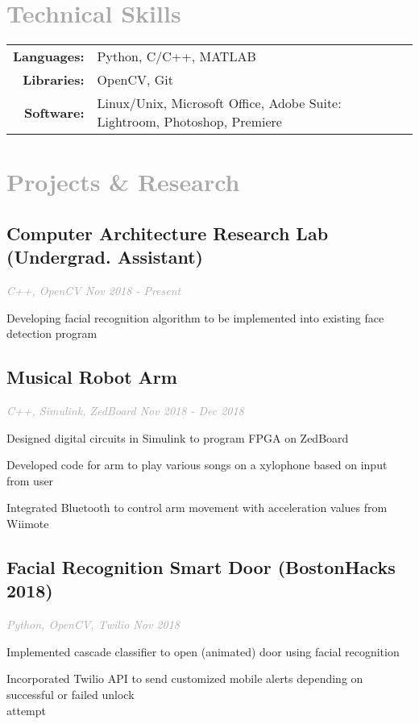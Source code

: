 \documentclass{article}
\begin{document}
{\section[Technical Skills \hfill]{\textcolor{darkgray}{Technical Skills \sout{\hfill}}}
	\begin{tabular}{rl}
	{\bfseries Languages: }&Python, C/C++, MATLAB\\
    {\bfseries Libraries: }&OpenCV, Git\\
    {\bfseries Software: }&Linux/Unix, Microsoft Office, Adobe Suite: Lightroom, Photoshop, Premiere
    \end{tabular}
    
\section[Projects \& Research \hfill]{\textcolor{darkgray}{Projects \& Research \sout{\hfill}}}
    \subsection{\bfseries\large Computer Architecture Research Lab (Undergrad. Assistant)} 
    \textit{\textcolor{darkgray}{C++, OpenCV \hfill \textit{Nov 2018 - Present}}}
    \begin{myitemize}
        \item Developing facial recognition algorithm to be implemented into existing face detection program
    \end{myitemize}
    \subsection{\bfseries\large Musical Robot Arm}
    \textit{\textcolor{darkgray}{C++, Simulink, ZedBoard \hfill \textit{Nov 2018 - Dec 2018}}}
    \begin{myitemize}
        \item Designed digital circuits in Simulink to program FPGA on ZedBoard
        \item Developed code for arm to play various songs on a xylophone based on input from user
        \item Integrated Bluetooth to control arm movement with acceleration values from Wiimote
    \end{myitemize}
    \subsection{\bfseries\large Facial Recognition Smart Door (BostonHacks 2018)}
    \textit{\textcolor{darkgray}{Python, OpenCV, Twilio  \hfill \textit{Nov 2018}}}
    \begin{myitemize}
        \item Implemented cascade classifier to open (animated) door using facial recognition
        \item Incorporated Twilio API to send customized mobile alerts depending on successful or failed unlock\\ 
        attempt
    \end{myitemize}

}
\end{document}
